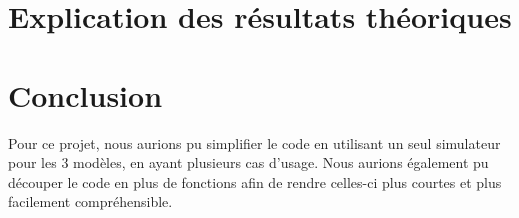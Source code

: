 \documentclass[a4paper,11pt]{article}
\begin{document}
\section{Explication des résultats théoriques}
	
\section{Conclusion}
	Pour ce projet, nous aurions pu simplifier le code en utilisant un seul simulateur pour les 3 modèles, en ayant plusieurs cas d'usage. Nous aurions également pu découper le code en plus de fonctions afin de rendre celles-ci plus courtes et plus facilement compréhensible.
\end{document}

